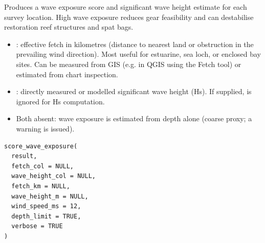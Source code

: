 \documentclass[a4paper]{book}
\begin{document}
\begin{Description}
Produces a wave exposure score  and significant wave height estimate
for each survey location. High wave exposure reduces gear feasibility and
can destabilise restoration reef structures and spat bags.

\begin{itemize}

\item{} : effective fetch in kilometres (distance to nearest land or
obstruction in the prevailing wind direction). Most useful for estuarine,
sea loch, or enclosed bay sites. Can be measured from GIS (e.g. in QGIS
using the Fetch tool) or estimated from chart inspection.
\item{} : directly measured or modelled significant wave height
(Hs). If supplied,  is ignored for Hs computation.
\item{} Both absent: wave exposure is estimated from depth alone (coarse proxy;
a warning is issued).

\end{itemize}

\end{Description}
%
\begin{Usage}
\begin{verbatim}
score_wave_exposure(
  result,
  fetch_col = NULL,
  wave_height_col = NULL,
  fetch_km = NULL,
  wave_height_m = NULL,
  wind_speed_ms = 12,
  depth_limit = TRUE,
  verbose = TRUE
)
\end{verbatim}
\end{Usage}
%
\end{document}
